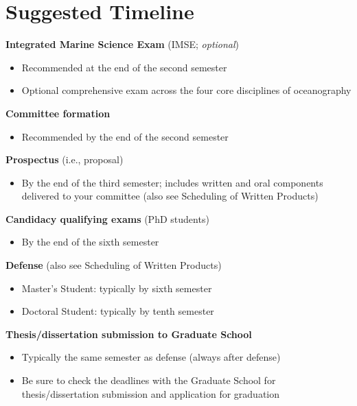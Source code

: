 \documentclass[
]{article}
\providecommand{\tightlist}{%
  \setlength{\itemsep}{0pt}\setlength{\parskip}{0pt}}
\begin{document}
\hypertarget{suggested-timeline}{%
\section{\texorpdfstring{\textbf{Suggested Timeline}}{Suggested Timeline}}\label{suggested-timeline}}

\textbf{Integrated Marine Science Exam} (IMSE; \emph{optional})

\begin{itemize}
\tightlist
\item
  Recommended at the end of the second semester
\item
  Optional comprehensive exam across the four core disciplines of oceanography
\end{itemize}

\textbf{Committee formation}

\begin{itemize}
\tightlist
\item
  Recommended by the end of the second semester
\end{itemize}

\textbf{Prospectus} (i.e., proposal)

\begin{itemize}
\tightlist
\item
  By the end of the third semester; includes written and oral components delivered to your committee (also see Scheduling of Written Products)
\end{itemize}

\textbf{Candidacy qualifying exams} (PhD students)

\begin{itemize}
\tightlist
\item
  By the end of the sixth semester
\end{itemize}

\textbf{Defense} (also see Scheduling of Written Products)

\begin{itemize}
\tightlist
\item
  Master's Student: typically by sixth semester
\item
  Doctoral Student: typically by tenth semester
\end{itemize}

\textbf{Thesis/dissertation submission to Graduate School}

\begin{itemize}
\tightlist
\item
  Typically the same semester as defense (always after defense)
\item
  Be sure to check the deadlines with the Graduate School for thesis/dissertation submission and application for graduation
\end{itemize}
\end{document}
